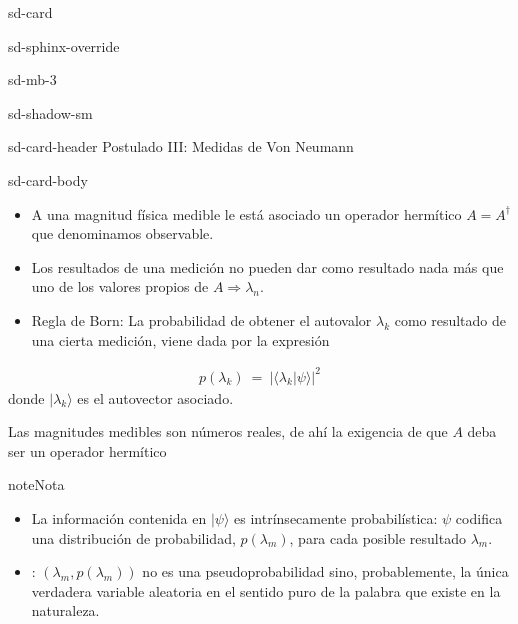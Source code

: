 \documentclass[letterpaper,10pt,english]{jupyterBook}
\newcommand{\ket}[1]{|#1\rangle}
\newcommand{\braket}[2]{\langle #1|#2\rangle}
\begin{document}
\begin{sphinxuseclass}{sd-card}
\begin{sphinxuseclass}{sd-sphinx-override}
\begin{sphinxuseclass}{sd-mb-3}
\begin{sphinxuseclass}{sd-shadow-sm}
\begin{sphinxuseclass}{sd-card-header}
\sphinxAtStartPar
Postulado III: Medidas de Von Neumann

\end{sphinxuseclass}
\begin{sphinxuseclass}{sd-card-body}
\sphinxAtStartPar

\begin{itemize}
\item {} 
\sphinxAtStartPar
A una magnitud física medible le está asociado   un operador hermítico  \( A= A^\dagger\) que denominamos observable.

\item {} 
\sphinxAtStartPar
Los resultados de una medición no pueden dar como resultado nada más que uno de los valores propios de \(A \Rightarrow \lambda_n\).

\item {} 
\sphinxAtStartPar
 Regla de Born: La probabilidad de obtener  el autovalor \(\lambda_k\) como resultado de una cierta medición, viene dada por
la expresión

\end{itemize}
\begin{equation*}
\begin{split}
p(\lambda_k)~ = ~|\braket{\lambda_k}{\psi}|^2
\end{split}
\end{equation*}
\sphinxAtStartPar
donde \(\ket{\lambda_k}\) es el autovector asociado.

\end{sphinxuseclass}
\end{sphinxuseclass}
\end{sphinxuseclass}
\end{sphinxuseclass}
\end{sphinxuseclass}
\sphinxAtStartPar
Las magnitudes medibles son números reales, de ahí la exigencia de que \(A\) deba ser un operador hermítico

\begin{sphinxadmonition}{note}{Nota}
\begin{itemize}
\item {} 
\sphinxAtStartPar
La información contenida en \(\ket{\psi}\) es intrínsecamente probabilística: \(\psi\) codifica una distribución de probabilidad, \(p(\lambda_m)\), para cada posible resultado \(\lambda_m\).

\item {} 
\sphinxAtStartPar
{}:  \((\lambda_m,p(\lambda_m))\) no es una pseudo\sphinxhyphen{}probabilidad sino, probablemente, la única verdadera variable aleatoria en el sentido puro de la palabra que existe en la naturaleza.

\end{itemize}
\end{sphinxadmonition}
\end{document}
